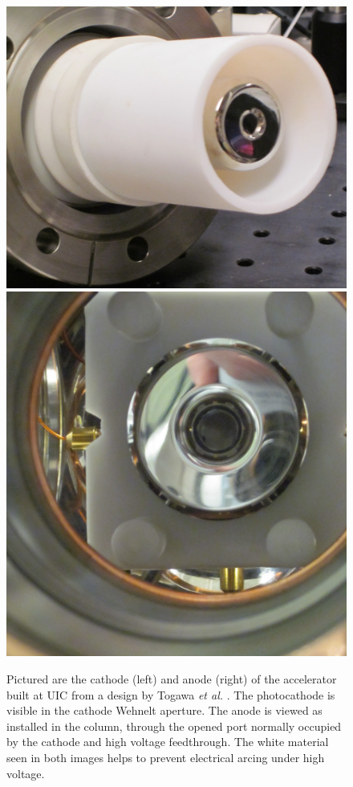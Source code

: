 \begin{figure}
  \centering
  \centerline{\includegraphics{cathode.jpg} \includegraphics{anode.jpg}}
  \caption{
    Pictured are the cathode (left) and anode (right) of the accelerator built at UIC from a design by Togawa \protect\textit{et al.} \protect\cite{togawa_ceb6_2007}.
    The photocathode is visible in the cathode Wehnelt aperture.
    The anode is viewed as installed in the column, through the opened port normally occupied by the cathode and high voltage feedthrough.
    The white material seen in both images helps to prevent electrical arcing under high voltage.
  }
  \label{fig:togawa-pic}
\end{figure}

